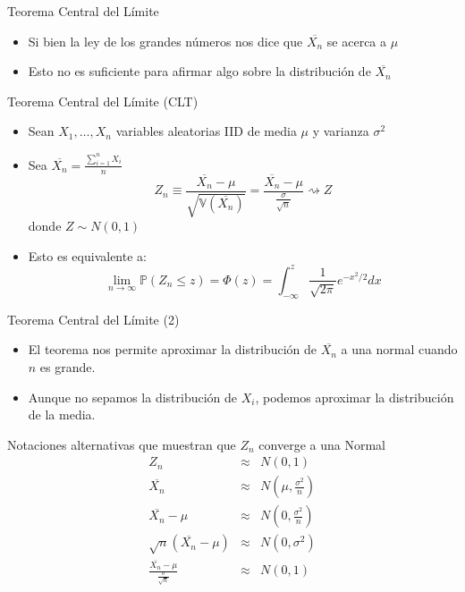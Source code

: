 \documentclass[handout]{beamer}
\begin{document}
\begin{frame}{Teorema Central del Límite}
\scriptsize{
\begin{itemize}
 \item Si bien la ley de los grandes números nos dice que $\overline{X_{n}}$ se acerca a $\mu$
 \item Esto no es suficiente para afirmar algo sobre la distribución de $\overline{X_{n}}$
\end{itemize}

\begin{block}{Teorema Central del Límite (CLT)}
\begin{itemize}
 \item Sean $X_1, \dots , X_n$ variables aleatorias IID de media $\mu$ y varianza $\sigma^2$
 \item Sea $\overline{X_{n}}=\frac{\sum_{i=1}^{n} X_i}{n}$
\begin{displaymath}
 Z_{n} \equiv \frac{\overline{X_{n}}-\mu}{\sqrt{\mathbb{V}(\overline{X_{n}})}}=\frac{\overline{X_{n}}-\mu}{\frac{\sigma}{\sqrt{n}}}  \rightsquigarrow Z
\end{displaymath}
donde $Z\sim N(0,1)$
\item Esto es equivalente a:
\begin{displaymath}
 \lim_{n\rightarrow \infty} \mathbb{P}(Z_{n} \leq z) = \Phi(z) = \int_{-\infty}^{z}\frac{1}{\sqrt{2\pi}}e^{-x^2/2}dx
\end{displaymath}
\end{itemize}
\end{block}


} 
\end{frame}

\begin{frame}{Teorema Central del Límite (2)}
\begin{itemize}
 \item El teorema nos permite aproximar la distribución de $\overline{X_{n}}$ a una normal cuando $n$ es grande. 
 \item Aunque no sepamos la distribución de $X_{i}$, podemos aproximar la distribución de la media.
\end{itemize}


\scriptsize{
\begin{block}{Notaciones alternativas que muestran que $Z_{n}$ converge a una  Normal}
\begin{eqnarray*}
  Z_n  &\approx &N(0,1)     \nonumber \\
  \overline{X_{n}} & \approx & N \left(\mu, \frac{\sigma^2}{n} \right)   \nonumber \\
  \overline{X_{n}}-\mu & \approx & N \left(0, \frac{\sigma^2}{n} \right)   \nonumber \\
  \sqrt{n}(\overline{X_{n}}-\mu) & \approx & N (0,\sigma^2) \nonumber \\
  \frac{\overline{X_{n}}-\mu}{\frac{\sigma}{\sqrt{n}}} & \approx & N (0,1) \nonumber \\
\end{eqnarray*}


\end{block}


 }
\end{frame}
\end{document}
